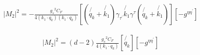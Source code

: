 \begin{equation}
\begin{split}
|M_2|^2=-\frac{{g_s}^2 C_F}{4(k_1 \cdot q_k)(k_1 \cdot q_k)}[(\not{q_k}+\not{k_1}) {\gamma}_{{\tau}^{\prime}}\not{k_1}{\gamma}^{\tau}(\not{q_k}+\not{k_1})][-g^{{\eta}{\eta}^{\prime}}]
\end{split}
\end{equation}

\begin{equation}
\begin{split}
|M_2|^2=(d-2)\frac{{g_s}^2 C_F}{4(k_1 \cdot q_k)}[\not{q_k}][-g^{{\eta}{\eta}^{\prime}}]
\end{split}
\end{equation}




